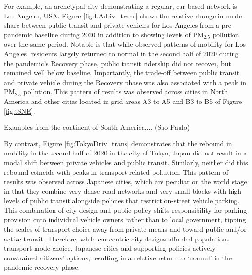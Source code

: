 \documentclass[preprint,12pt]{elsarticle}
\begin{document}
For example, an archetypal city demonstrating a regular, car-based network is Los Angeles, USA. Figure \ref{fig:LAdriv_trans} shows the relative change in mode share between public transit and private vehicles for Los Angeles from a pre-pandemic baseline during 2020 in addition to showing levels of PM$_{2.5}$ pollution over the same period. Notable is that while observed patterns of mobility for Los Angeles' residents largely returned to normal in the second half of 2020 during the pandemic's Recovery phase, public transit ridership did not recover, but remained well below baseline. Importantly, the trade-off between public transit and private vehicle during the Recovery phase was also associated with a peak in PM$_{2.5}$ pollution. This pattern of results was observed across cities in North America and other cities located in grid areas A3 to A5 and B3 to B5 of Figure \ref{fig:tSNE}.

Examples from the continent of South America.... (Sao Paulo)

By contrast, Figure \ref{fig:TokyoDriv_trans} demonstrates that the rebound in mobility in the second half of 2020 in the city of Tokyo, Japan did not result in a modal shift between private vehicles and public transit. Similarly, neither did this rebound coincide with peaks in transport-related pollution. This pattern of results was observed across Japanese cities, which are peculiar on the world stage in that they combine very dense road networks and very small blocks with high levels of public transit alongside policies that restrict on-street vehicle parking\cite{clements2019socialising}. This combination of city design and public policy shifts responsibility for parking provision onto individual vehicle owners rather than to local government, tipping the scales of transport choice away from private means and toward public and/or active transit. Therefore, while car-centric city designs afforded populations transport mode choice, Japanese cities and supporting policies actively constrained citizens' options, resulting in a relative return to `normal' in the pandemic recovery phase.



\end{document}
